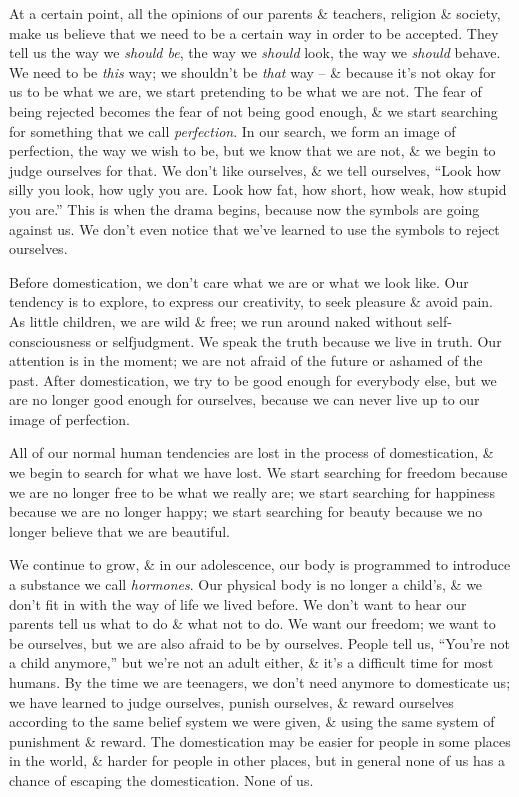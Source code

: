 \documentclass{article}
\numberwithin{equation}{section}
\begin{document}
At a certain point, all the opinions of our parents \& teachers, religion \& society, make us believe that we need to be a certain way in order to be accepted. They tell us the way we \textit{should be}, the way we \textit{should} look, the way we \textit{should} behave. We need to be \textit{this} way; we shouldn't be \textit{that} way -- \& because it's not okay for us to be what we are, we start pretending to be what we are not. The fear of being rejected becomes the fear of not being good enough, \& we start searching for something that we call \textit{perfection}. In our search, we form an image of perfection, the way we wish to be, but we know that we are not, \& we begin to judge ourselves for that. We don't like ourselves, \& we tell ourselves, ``Look how silly you look, how ugly you are. Look how fat, how short, how weak, how stupid you are.'' This is when the drama begins, because now the symbols are going against us. We don't even notice that we've learned to use the symbols to reject ourselves.

Before domestication, we don't care what we are or what we look like. Our tendency is to explore, to express our creativity, to seek pleasure \& avoid pain. As little children, we are wild \& free; we run around naked without self-consciousness or selfjudgment. We speak the truth because we live in truth. Our attention is in the moment; we are not afraid of the future or ashamed of the past. After domestication, we try to be good enough for everybody else, but we are no longer good enough for ourselves, because we can never live up to our image of perfection.

All of our normal human tendencies are lost in the process of domestication, \& we begin to search for what we have lost. We start searching for freedom because we are no longer free to be what we really are; we start searching for happiness because we are no longer happy; we start searching for beauty because we no longer believe that we are beautiful.

We continue to grow, \& in our adolescence, our body is programmed to introduce a substance we call \textit{hormones}. Our physical body is no longer a child's, \& we don't fit in with the way of life we lived before. We don't want to hear our parents tell us what to do \& what not to do. We want our freedom; we want to be ourselves, but we are also afraid to be by ourselves. People tell us, ``You're not a child anymore,'' but we're not an adult either, \& it's a difficult time for most humans. By the time we are teenagers, we don't need anymore to domesticate us; we have learned to judge ourselves, punish ourselves, \& reward ourselves according to the same belief system we were given, \& using the same system of punishment \& reward. The domestication may be easier for people in some places in the world, \& harder for people in other places, but in general none of us has a chance of escaping the domestication. None of us.
\end{document}
